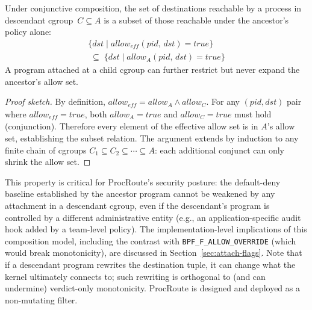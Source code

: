 \documentclass[sigconf]{acmart}
\begin{document}
\begin{theorem}
\label{thm:monotonicity}
Under conjunctive composition, the set of destinations reachable
by a process in descendant cgroup~$C \subseteq A$ is a subset of
those reachable under the ancestor's policy alone:
\begin{multline*}
  \{ \mathit{dst} \mid
     \mathit{allow}_{\mathit{eff}}(\mathit{pid},\, \mathit{dst})
     = \mathit{true} \}\\
  \;\subseteq\;
  \{ \mathit{dst} \mid
     \mathit{allow}_A(\mathit{pid},\, \mathit{dst})
     = \mathit{true} \}
\end{multline*}
A program attached at a child cgroup can further restrict but
never expand the ancestor's allow set.
\end{theorem}

\begin{proof}[Proof sketch]
By definition, $\mathit{allow}_{\mathit{eff}} =
\mathit{allow}_A \land \mathit{allow}_C$.
For any $(\mathit{pid}, \mathit{dst})$ pair where
$\mathit{allow}_{\mathit{eff}} = \mathit{true}$, both
$\mathit{allow}_A = \mathit{true}$ and
$\mathit{allow}_C = \mathit{true}$ must hold (conjunction).
Therefore every element of the effective allow set is in
$A$'s allow set, establishing the subset relation.
The argument extends by induction to any finite chain of
cgroups $C_1 \subseteq C_2 \subseteq \cdots \subseteq A$:
each additional conjunct can only shrink the allow set.
\end{proof}

This property is critical for ProcRoute's security posture: the
default-deny baseline established by the ancestor program cannot
be weakened by any attachment in a descendant cgroup, even if
the descendant's program is controlled by a different
administrative entity (e.g., an application-specific audit hook
added by a team-level policy).
The implementation-level implications of this composition model,
including the contrast with \texttt{BPF\_F\_ALLOW\_OVERRIDE}
(which would break monotonicity), are discussed in
Section~\ref{sec:attach-flags}.
Note that if a descendant program rewrites the destination tuple,
it can change what the kernel ultimately connects to; such rewriting
is orthogonal to (and can undermine) verdict-only monotonicity.
ProcRoute is designed and deployed as a non-mutating filter.
\end{document}
